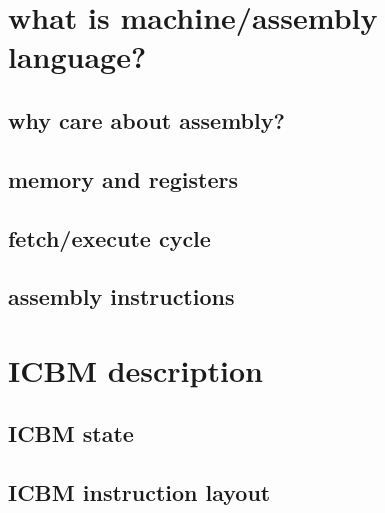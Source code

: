 
\begin{frame}
    \titlepage
\end{frame}

%

\section{what is machine/assembly language?}



\subsection{why care about assembly?}



\subsection{memory and registers}



\subsection{fetch/execute cycle}



\subsection{assembly instructions}




\section{ICBM description}



\subsection{ICBM state}



\subsection{ICBM instruction layout}

